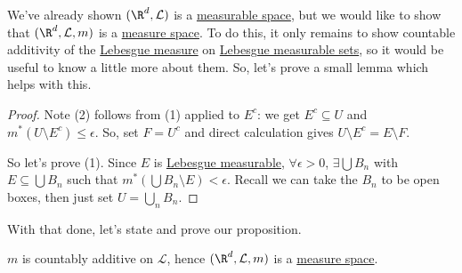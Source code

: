 \documentclass{article}
\newcommand{\1}[1]{\mathbbm{1}_{#1}}
\begin{document}
We've already shown $(\R^d, \mathcal{L})$ is a \hyperlink{def:measurableSpace}{measurable space}, but we would like to show that $(\R^d, \mathcal{L}, m)$ is a \hyperlink{def:measureSpace}{measure space}.
To do this, it only remains to show countable additivity of the \hyperlink{def:lebMeas}{Lebesgue measure} on \hyperlink{def:lebMAble}{Lebesgue measurable sets}, so it would be useful to know a little more about them.
So, let's prove a small lemma which helps with this.


\begin{proof}
    Note (2) follows from (1) applied to $E^c$: we get $E^c \subseteq U$ and $m^*(U \setminus E^c) \leq \epsilon$.
    So, set $F = U^c$ and direct calculation gives $U \setminus E^c = E \setminus F$.

    So let's prove (1). Since $E$ is \hyperlink{def:lebMAble}{Lebesgue measurable}, $\forall \epsilon > 0$, $\exists\bigcup B_n$ with $E \subseteq \bigcup B_n$ such that $m^*(\bigcup B_n \setminus E) < \epsilon$.
    Recall we can take the $B_n$ to be open boxes, then just set $U  = \bigcup_n B_n$.
\end{proof}

With that done, let's state and prove our proposition.

\begin{prop}
    $m$ is countably additive on $\mathcal{L}$, hence $(\R^d, \mathcal{L}, m)$ is a \hyperlink{def:measureSpace}{measure space}.
\end{prop}
\end{document}
